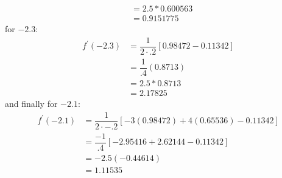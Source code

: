 \documentclass{article}
\begin{document}
\begin{itemize}
\begin{answer}
\begin{align*}
                                     &= 2.5 * 0.600563                           \\
                                     &= 0.9151775                                  
                \end{align*}
            for $-2.3$:
                \begin{align*}
                    f^{\prime}(-2.3) &= \dfrac{1}{2 \cdot .2}[0.98472 - 0.11342] \\
                                     &= \dfrac{1}{.4}(0.8713)                    \\
                                     &= 2.5 * 0.8713                             \\
                                     &= 2.17825                                     
                \end{align*}
            and finally for $-2.1$:
                \begin{align*}
                    f^{\prime}(-2.1) &= \dfrac{1}{2 \cdot -.2}[-3(0.98472) + 4(0.65536) - 0.11342] \\
                                     &= \dfrac{-1}{.4}[-2.95416 + 2.62144 - 0.11342]               \\
                                     &= -2.5(-0.44614)                                             \\
                                     &= 1.11535                                                      
                \end{align*}
        \end{answer}
    \end{itemize}
\end{document}
